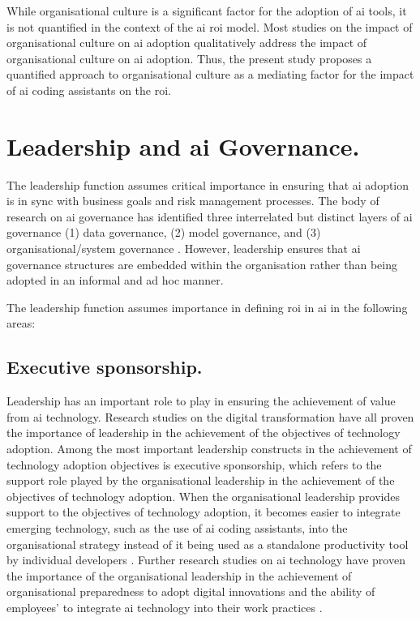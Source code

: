While organisational culture is a significant factor for the adoption of \gls{ai} tools, it is not quantified in the context of the \gls{ai} \gls{roi} model. Most studies on the impact of organisational culture on \gls{ai} adoption qualitatively address the impact of organisational culture on \gls{ai} adoption. Thus, the present study proposes a quantified approach to organisational culture as a mediating factor for the impact of \gls{ai} coding assistants on the \gls{roi}.

\section {Leadership and \gls{ai} Governance.}
\label{sec:Leadership and AI Governance}
The leadership function assumes critical importance in ensuring that \gls{ai} adoption is in sync with business goals and risk management processes. The body of research on \gls{ai} governance has identified three interrelated but distinct layers of \gls{ai} governance (1) data governance, (2) model governance, and (3) organisational/system governance \autocite{Schneider2023}. However, leadership ensures that \gls{ai} governance structures are embedded within the organisation rather than being adopted in an informal and ad hoc manner.

The leadership function assumes importance in defining \gls{roi} in \gls{ai} in the following areas:

\subsection {Executive sponsorship.}
\label{sec:Executive sponsorship}
Leadership has an important role to play in ensuring the achievement of value from \gls{ai} technology. Research studies on the digital transformation have all proven the importance of leadership in the achievement of the objectives of technology adoption. Among the most important leadership constructs in the achievement of technology adoption objectives is executive sponsorship, which refers to the support role played by the organisational leadership in the achievement of the objectives of technology adoption. When the organisational leadership provides support to the objectives of technology adoption, it becomes easier to integrate emerging technology, such as the use of \gls{ai} coding assistants, into the organisational strategy instead of it being used as a standalone productivity tool by individual developers \autocite{Schneider2023}. Further research studies on \gls{ai} technology have proven the importance of the organisational leadership in the achievement of organisational preparedness to adopt digital innovations and the ability of employees' to integrate \gls{ai} technology into their work practices \autocite{An2024}.

